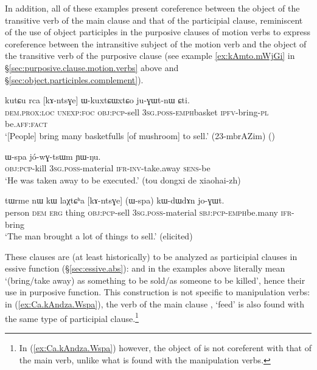 In addition, all of these examples present coreference between the object of the transitive verb of the main clause and that of the participial clause, reminiscent of the use of object participles in the purposive clauses of motion verbs to express coreference between the intransitive subject of the motion verb and the object of the transitive verb of the purposive clause (see example \ref{ex:kAmto.mWjGi} in §\ref{sec:purposive.clause.motion.verbs} above and §\ref{sec:object.participles.complement}).


\begin{exe}
	\ex \label{ex:kAntsGe.WkuxtCWxtCo}
	\gll  kutɕu rca [kɤ-ntsɣe] ɯ-kuxtɕɯ\redp{}xtɕo ju-ɣɯt-nɯ ɕti. \\
	\textsc{dem}.\textsc{prox}:\textsc{loc} \textsc{unexp}:\textsc{foc} \textsc{obj}:\textsc{pcp}-sell \textsc{3sg}.\textsc{poss}-\textsc{emph}\redp{}basket \textsc{ipfv}-bring-\textsc{pl} be.\textsc{aff}:\textsc{fact} \\
	\glt `[People] bring many basketfulls [of mushroom] to sell.' (23-mbrAZim)
	()
\end{exe}

\begin{exe}
	\ex \label{ex:kAsat.Wspa.jowGtsWm}
	\gll [kɤ-sat] ɯ-spa jó-wɣ-tsɯm ɲɯ-ŋu. \\
	\textsc{obj}:\textsc{pcp}-kill \textsc{3sg}.\textsc{poss}-material \textsc{ifr}-\textsc{inv}-take.away \textsc{sens}-be  \\
	\glt `He was taken away to be executed.' (tou dongxi de xiaohai-zh)
\end{exe}

\begin{exe}
	\ex \label{ex:kAntsGe.Wspa.joGWt}
	\gll tɯrme nɯ kɯ laχtɕʰa [kɤ-ntsɣe] (ɯ-spa) kɯ-dɯ\redp{}dɤn jo-ɣɯt. \\
	person \textsc{dem} \textsc{erg} thing \textsc{obj}:\textsc{pcp}-sell \textsc{3sg}.\textsc{poss}-material \textsc{sbj}:\textsc{pcp}-\textsc{emph}\redp{}be.many \textsc{ifr}-bring \\
	\glt `The man brought a lot of things to sell.' (elicited)
\end{exe}

These clauses are (at least historically) to be analyzed as participial clauses in essive function (§\ref{sec:essive.abs}):  and  in the examples above literally mean `(bring/take away) as something to be sold/as someone to be killed', hence their use in purposive function. This construction is not specific to manipulation verbs: in (\ref{ex:Ca.kAndza.Wspa}), the verb of the main clause , `feed' is also found with the same type of participial clause.\footnote{In (\ref{ex:Ca.kAndza.Wspa}) however, the object of  is not coreferent with that of the main verb, unlike what is found with the manipulation verbs. }

